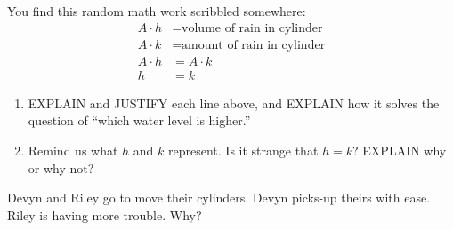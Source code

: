 \documentclass[nooutcomes,noauthor,hints]{ximera}
\begin{document}
\begin{question}
  You find this random math work scribbled somewhere:
  \begin{align}
    A \cdot h &= \text{volume of rain in cylinder}\\
    A \cdot k &= \text{amount of rain in cylinder}\\
    A\cdot h &= A\cdot k\\
    h &= k
  \end{align}
  \begin{enumerate}
  \item EXPLAIN and JUSTIFY each line above, and EXPLAIN how it solves
    the question of ``which water level is higher.''
  \item Remind us what $h$ and $k$ represent. Is it strange that
    $h=k$? EXPLAIN why or why not?
  \end{enumerate}
\end{question}
\mynewpage


\begin{question}
 Devyn and Riley go to move their cylinders. Devyn picks-up theirs
 with ease. Riley is having more trouble. Why?
\end{question}
\end{document}
